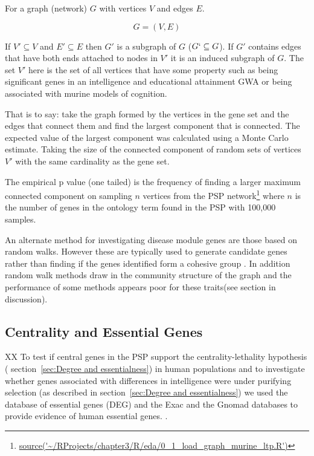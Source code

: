For a graph (network) $G$ with vertices $V$ and edges $E$.

\begin{equation}
    G = (V,E)
\end{equation}

If $ V' \subseteq V$ and  $E' \subseteq E$ then $G'$ is a subgraph of $G$ ($ G` \subseteq G$). If $G'$ contains edges that have both ends attached to nodes in $V'$ it is an induced subgraph of $G$\cite{diestel2017basics}. The set $V'$ here is the set of all vertices that have some property such as being significant genes in an intelligence and educational attainment GWA or being associated with murine models of cognition.

That is to say: take the graph formed by the vertices in the gene set and the edges that connect them and find the largest component that is connected. The expected value of the largest component was calculated using a Monte Carlo estimate. Taking the size of the connected component of random sets of vertices $V'$ with the same cardinality as the gene set.

The empirical p value (one tailed) is the frequency of finding a larger maximum connected component on sampling $n$ vertices from the PSP network\footnote{\url{source('~/RProjects/chapter3/R/eda/0_1_load_graph_murine_ltp.R')}} where $n$ is the number of genes in the ontology term found in the PSP with 100,000 samples.

An alternate method for investigating disease module genes are those based on random walks. However these are typically used to generate candidate genes rather than finding if the genes identified form a cohesive group . In addition random walk methods draw in the community structure of the graph and the performance of some methods appears poor for these traits(see section in discussion). 



\subsection{Centrality and Essential Genes}XX
\label{sec:centrality and essential genes}
To test if central genes in the PSP support the centrality-lethality hypothesis ( section~\ref{sec:Degree and essentialness}) in human populations  and to investigate whether genes associated with differences in intelligence were under purifying selection (as described in \cite{hill2016molecular} section~\ref{sec:Degree and essentialness}) we used the database of essential genes (DEG)\cite{luo2021deg} and the Exac and the Gnomad databases to provide evidence of human essential genes. . 

